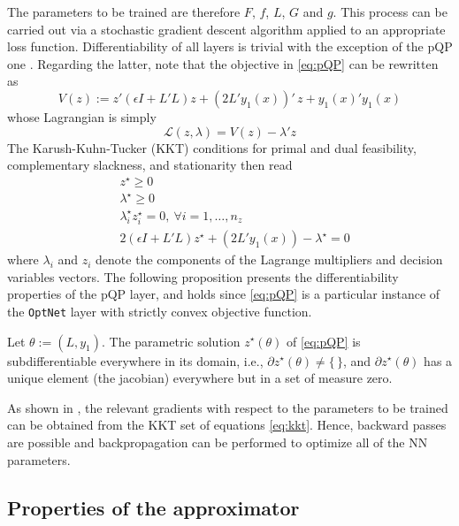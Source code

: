 The parameters to be trained are therefore $F$, $f$, $L$, $G$ and $g$. This process can be carried out via a stochastic gradient descent algorithm applied to an appropriate loss function. Differentiability of all layers is trivial with the exception of the pQP one \citep{gould2016differentiating,amos2017optnet}. Regarding the latter, note that the objective in \eqref{eq:pQP} can be rewritten as
\begin{equation}
	\label{eq:idk}
	V(z) := z'(\epsilon I + L'L)z + (2L'y_1(x))' \, z + y_1(x)'y_1(x)
\end{equation}
whose Lagrangian is simply
\begin{equation}
	\mathcal{L}(z,\lambda) = V(z) - \lambda'z
\end{equation}
The Karush-Kuhn-Tucker (KKT) conditions for primal and dual feasibility, complementary slackness, and stationarity then read 
\begin{subequations}
	\label{eq:kkt}
	\begin{align}
		& z^\star \geq 0 \\
		& \lambda^\star \geq 0 \\
		& \lambda_i^\star z_i^\star = 0, \ \forall i = 1,\dots,n_z \\
		& 2(\epsilon I + L'L)z^\star + (2L'y_1(x)) - \lambda^\star = 0
	\end{align}
\end{subequations}
where $\lambda_i$ and $z_i$ denote the components of the Lagrange multipliers and decision variables vectors. The following proposition presents the differentiability properties of the pQP layer, and holds since \eqref{eq:pQP} is a particular instance of the \texttt{OptNet} layer \citep{amos2017optnet} with strictly convex objective function.

\begin{proposition}
	Let $\theta := (L,y_1)$. The parametric solution $z^\star(\theta)$ of \eqref{eq:pQP} is subdifferentiable everywhere in its domain, i.e., $\partial z^\star(\theta) \neq \{ \, \}$, and $\partial z^\star(\theta)$ has a unique element (the jacobian) everywhere but in a set of measure zero.
\end{proposition}

As shown in \cite{amos2017optnet}, the relevant gradients with respect to the parameters to be trained can be obtained from the KKT set of equations \eqref{eq:kkt}. Hence, backward passes are possible and backpropagation can be performed to optimize all of the NN parameters.

\subsection{Properties of the approximator}

